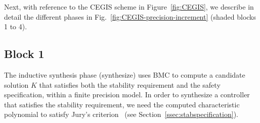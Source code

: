 %
%

Next, 
with reference to the CEGIS scheme in Figure~\ref{fig:CEGIS}, 
we describe in detail the different phases in Fig.~\ref{fig:CEGIS-precision-increment} (shaded blocks 1 to 4).  


\subsection{Block 1}

The inductive synthesis phase ({\sc synthesize}) uses BMC to compute a
candidate solution $K$ that satisfies both the stability requirement and the safety specification, 
within a finite precision model.  
In order to synthesize a controller that satisfies the stability requirement, 
we need the computed characteristic polynomial to satisfy Jury's criterion~\cite{fadali} (see Section~\ref{ssec:stabspecification}). 

